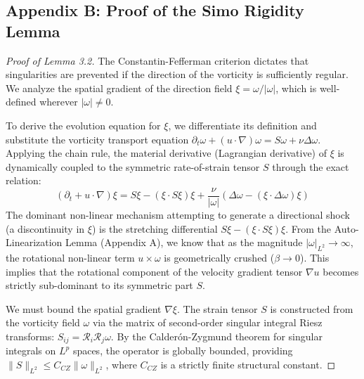 \documentclass[12pt,a4paper]{article}
\theoremstyle{plain}
\theoremstyle{definition}
\theoremstyle{remark}
\begin{document}
\subsection{Appendix B: Proof of the Simo Rigidity Lemma}
\begin{proof}[Proof of Lemma 3.2]
The Constantin-Fefferman criterion dictates that singularities are prevented if the direction of the vorticity is sufficiently regular. We analyze the spatial gradient of the direction field $\xi = \omega / |\omega|$, which is well-defined wherever $|\omega| \neq 0$. 

To derive the evolution equation for $\xi$, we differentiate its definition and substitute the vorticity transport equation $\partial_t \omega + (u \cdot \nabla)\omega = S\omega + \nu \Delta \omega$. Applying the chain rule, the material derivative (Lagrangian derivative) of $\xi$ is dynamically coupled to the symmetric rate-of-strain tensor $S$ through the exact relation:
\begin{equation}
    (\partial_t + u \cdot \nabla)\xi = S\xi - (\xi \cdot S \xi)\xi + \frac{\nu}{|\omega|} \left( \Delta \omega - (\xi \cdot \Delta \omega)\xi \right)
\end{equation}
The dominant non-linear mechanism attempting to generate a directional shock (a discontinuity in $\xi$) is the stretching differential $S\xi - (\xi \cdot S \xi)\xi$. From the Auto-Linearization Lemma (Appendix A), we know that as the magnitude $|\omega|_{L^2} \to \infty$, the rotational non-linear term $u \times \omega$ is geometrically crushed ($\beta \to 0$). This implies that the rotational component of the velocity gradient tensor $\nabla u$ becomes strictly sub-dominant to its symmetric part $S$.

We must bound the spatial gradient $\nabla \xi$. The strain tensor $S$ is constructed from the vorticity field $\omega$ via the matrix of second-order singular integral Riesz transforms: $S_{ij} = \mathcal{R}_i \mathcal{R}_j \omega$. By the Calderón-Zygmund theorem for singular integrals on $L^p$ spaces, the operator is globally bounded, providing $\|S\|_{L^2} \leq C_{CZ} \|\omega\|_{L^2}$, where $C_{CZ}$ is a strictly finite structural constant.


\end{proof}
\end{document}
